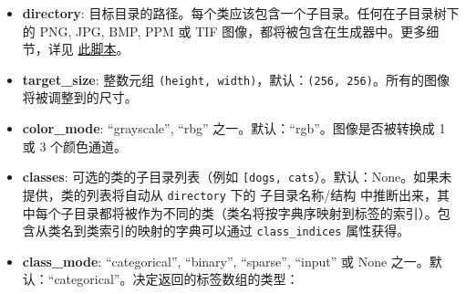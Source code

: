 \begin{itemize}
\tightlist
\item
  \textbf{directory}:
  目标目录的路径。每个类应该包含一个子目录。任何在子目录树下的 PNG, JPG,
  BMP, PPM 或 TIF 图像，都将被包含在生成器中。更多细节，详见
  \href{https://gist.github.com/fchollet/\%20\%20\%20\%20\%20\%20\%20\%200830affa1f7f19fd47b06d4cf89ed44d}{此脚本}。
\item
  \textbf{target\_size}: 整数元组
  \texttt{(height,\ width)}，默认：\texttt{(256,\ 256)}。所有的图像将被调整到的尺寸。
\item
  \textbf{color\_mode}: ``grayscale'', ``rbg''
  之一。默认：``rgb''。图像是否被转换成 1 或 3 个颜色通道。
\item
  \textbf{classes}: 可选的类的子目录列表（例如
  \texttt{{[}\textquotesingle{}dogs\textquotesingle{},\ \textquotesingle{}cats\textquotesingle{}{]}}）。默认：None。如果未提供，类的列表将自动从
  \texttt{directory} 下的 子目录名称/结构
  中推断出来，其中每个子目录都将被作为不同的类（类名将按字典序映射到标签的索引）。包含从类名到类索引的映射的字典可以通过
  \texttt{class\_indices} 属性获得。
\item
  \textbf{class\_mode}: ``categorical'', ``binary'', ``sparse'',
  ``input'' 或 None
  之一。默认：``categorical''。决定返回的标签数组的类型：


\end{itemize}
